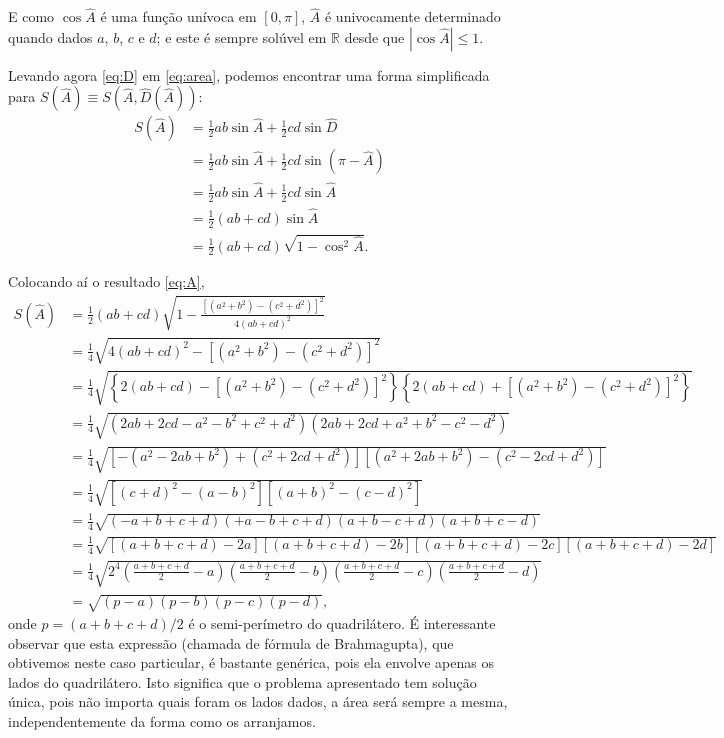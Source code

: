 \documentclass[a4paper,12pt]{scrartcl}
\begin{document}
  E como $\cos\hat A$ é uma função unívoca em $[0,\pi]$, $\hat A$ é univocamente determinado quando dados $a$, $b$, $c$ e $d$; e este é sempre solúvel em $\mathbb{R}$ desde que $|\cos\hat A| \le 1$.
  
  Levando agora \eqref{eq:D} em \eqref{eq:area}, podemos encontrar uma forma simplificada para $S(\hat A) \equiv S(\hat A, \hat D(\hat A))$:
  \begin{align*}
   S(\hat A) &= \frac{1}{2}ab\sin\hat A + \frac{1}{2}cd\sin\hat D\\
	     &= \frac{1}{2}ab\sin\hat A + \frac{1}{2}cd\sin\left(\pi - \hat A\right)\\
	     &= \frac{1}{2}ab\sin\hat A + \frac{1}{2}cd\sin\hat A\\
	     &= \frac{1}{2} (ab + cd)\sin\hat A\\
	     &= \frac{1}{2} (ab + cd)\sqrt{1- \cos^2\hat A}.
  \end{align*}
  
  Colocando aí o resultado \eqref{eq:A},
  \begin{align*}
   S(\hat A) &= \frac{1}{2}(ab+cd)\sqrt{1-\frac{\left[(a^2+b^2)-(c^2+d^2)\right]^2}{4(ab+cd)^2}} \\
	     &= \frac{1}{4}\sqrt{4(ab+cd)^2-\left[(a^2+b^2)-(c^2+d^2)\right]^2} \\
	     &= \frac{1}{4}\sqrt{\left\{2(ab+cd)-\left[(a^2+b^2)-(c^2+d^2)\right]^2\right\} \left\{2(ab+cd)+\left[(a^2+b^2)-(c^2+d^2)\right]^2\right\}} \\
	     &= \frac{1}{4}\sqrt{\left(2ab+2cd-a^2-b^2+c^2+d^2\right) \left(2ab+2cd+a^2+b^2-c^2-d^2\right)} \\
	     &= \frac{1}{4}\sqrt{\left[-(a^2-2ab+b^2)+(c^2+2cd+d^2)\right] \left[(a^2+2ab+b^2)-(c^2-2cd+d^2)\right]} \\
	     &= \frac{1}{4}\sqrt{\left[(c+d)^2-(a-b)^2\right] \left[(a+b)^2-(c-d)^2\right]} \\
	     &= \frac{1}{4}\sqrt{(-a+b+c+d)(+a-b+c+d)(a+b-c+d)(a+b+c-d)} \\
	     &= \frac{1}{4}\sqrt{\left[(a+b+c+d)-2a\right] \left[(a+b+c+d)-2b\right] \left[(a+b+c+d)-2c\right] \left[(a+b+c+d)-2d\right]} \\
	     &= \frac{1}{4}\sqrt{2^4\left(\frac{a+b+c+d}{2} - a\right) \left(\frac{a+b+c+d}{2} - b\right) \left(\frac{a+b+c+d}{2} - c\right) \left(\frac{a+b+c+d}{2} - d\right)} \\
	     &= \sqrt{(p-a)(p-b)(p-c)(p-d)},
  \end{align*}
  onde $p=(a+b+c+d)/2$ é o semi-perímetro do quadrilátero. É interessante observar que esta expressão (chamada de fórmula de Brahmagupta), que obtivemos neste caso particular, é bastante genérica, pois ela envolve apenas os lados do quadrilátero. Isto significa que o problema apresentado tem solução única, pois não importa quais foram os lados dados, a área será sempre a mesma, independentemente da forma como os arranjamos.
  
\end{document}

